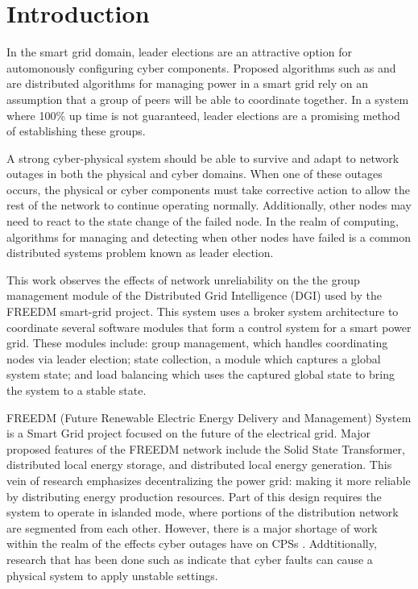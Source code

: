\chapter{Introduction}

In the smart grid domain, leader elections are an attractive option for
automonously configuring cyber components. Proposed algorithms such as
\cite{LOADBALANCING} and \cite{INCREMENTALCONSENSUS} are distributed
algorithms for managing power in a smart grid rely on an assumption that
a group of peers will be able to coordinate together. In a system where
100\% up time is not guaranteed, leader
elections are a promising method of establishing these groups.

A strong cyber-physical system should be able to survive and adapt to network
outages in both the physical and cyber domains. When one of these outages
occurs, the physical or cyber components must take corrective action to allow
the rest of the network to continue operating normally. Additionally, other
nodes may need to react to the state change of the failed node. In the realm
of computing, algorithms for managing and detecting when other nodes have
failed is a common distributed systems problem known as leader election.

This work observes the effects of network unreliability on the the group
management module of the Distributed Grid Intelligence (DGI) used by the
FREEDM smart-grid project. This system uses a broker system architecture to
coordinate several software modules that form a control system for a smart
power grid. These modules include: group management, which handles coordinating
nodes via leader election; state collection, a module which captures a global
system state; and load balancing which uses the captured global state to bring
the system to a stable state.

FREEDM (Future Renewable Electric Energy Delivery and Management) System
is a Smart Grid project focused on the future of the electrical grid. Major proposed features
of the FREEDM network include the Solid State Transformer, distributed local energy storage,
and distributed local energy generation\cite{FREEDMMIGRATION}. This vein of research emphasizes decentralizing the power grid: making it more reliable by distributing energy production resources. Part of this
design requires the system to operate in islanded mode, where portions of the distribution
network are segmented from each other. However, there is a major shortage of work
within the realm of the effects cyber outages have on CPSs
\cite{CYBERRESEARCHCALL} \cite{SMARTGRIDBENEFITS}. Addtitionally, research that
has been done such as \cite{HARINI} indicate that cyber faults can cause a physical
system to apply unstable settings.

